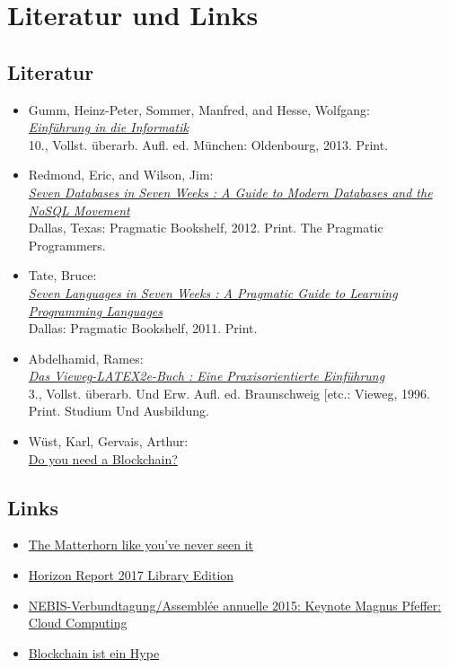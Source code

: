 \section{Literatur und Links}
{\renewcommand\labelitemi{}
\subsection{Literatur}
\begin{itemize}
  \item Gumm, Heinz-Peter, Sommer, Manfred, and Hesse, Wolfgang:\\
    \href{http://www.library.ethz.ch/DADS:default_scope:ebi01_prod007595267}{\it Einführung in die Informatik}\\
    10., Vollst. überarb. Aufl. ed. München: Oldenbourg, 2013. Print.
  \item Redmond, Eric, and Wilson, Jim:\\
    \href{http://www.library.ethz.ch/DADS:default_scope:ebi01_prod006803093}{\it Seven Databases in Seven Weeks : A Guide to Modern Databases and the NoSQL Movement}\\
    Dallas, Texas: Pragmatic Bookshelf, 2012. Print. The Pragmatic Programmers.
  \item Tate, Bruce:\\
    \href{http://www.library.ethz.ch/DADS:default_scope:ebi01_prod006317724}{\it Seven Languages in Seven Weeks : A Pragmatic Guide to Learning Programming Languages}\\
    Dallas: Pragmatic Bookshelf, 2011. Print.
  \item Abdelhamid, Rames:\\
    \href{http://www.library.ethz.ch/DADS:default_scope:ebi01_prod001553956}{\it Das Vieweg-LATEX2e-Buch : Eine Praxisorientierte Einführung}\\
    3., Vollst. überarb. Und Erw. Aufl. ed. Braunschweig [etc.: Vieweg, 1996. Print. Studium Und Ausbildung.
  \item Wüst, Karl, Gervais, Arthur:\\
    \href{https://eprint.iacr.org/2017/375.pdf}{Do you need a Blockchain?}
\end{itemize}

\subsection{Links}
\begin{itemize}
  \item \href{http://actu.epfl.ch/news/the-matterhorn-like-you-ve-never-seen-it/}{The Matterhorn like you've never seen it}
  \item \href{https://www.nmc.org/publication/nmc-horizon-report-2017-library-edition/}{Horizon Report 2017 Library Edition}
  \item \href{https://www.youtube.com/watch?v=HgmETqWeFrs}{NEBIS-Verbundtagung/Assemblée annuelle 2015: Keynote Magnus Pfeffer: Cloud Computing}
  \item \href{https://www.ethz.ch/de/news-und-veranstaltungen/eth-news/news/2017/09/data-science-interview-roger-wattenhofer.html}{Blockchain ist ein Hype}
\end{itemize}

}
